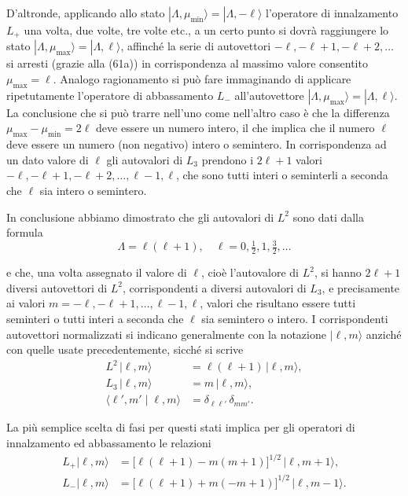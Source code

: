 \documentclass[11pt, a4paper]{book}
\numberwithin{equation}{section}
\begin{document}
D'altronde, applicando allo stato $|\Lambda,\mu_{\min}\rangle =
|\Lambda,-\ell\rangle$ l'operatore di innalzamento $L_+$ una volta, due
volte, tre volte etc., a un certo punto si dovrà raggiungere lo stato
$|\Lambda,\mu_{\max}\rangle = |\Lambda,\ell\rangle$, affinché la serie di
autovettori $-\ell, -\ell+1, -\ell+2, \ldots$ si arresti (grazie alla
(61a)) in corrispondenza al massimo valore consentito $\mu_{\max} = \ell$.
Analogo ragionamento si può fare immaginando di applicare ripetutamente
l'operatore di abbassamento $L_-$ all'autovettore $|\Lambda,\mu_{\max}\rangle
= |\Lambda,\ell\rangle$. La conclusione che si può trarre nell'uno come
nell'altro caso è che la differenza $\mu_{\max}-\mu_{\min} = 2\ell$ deve
essere un numero intero, il che implica che il numero $\ell$ deve essere
un numero (non negativo) intero o semintero. In corrispondenza ad un dato
valore di $\ell$ gli autovalori di $L_3$ prendono i $2\ell+1$ valori
$-\ell, -\ell+1, -\ell+2, \ldots, \ell-1, \ell$, che sono tutti interi o
seminterli a seconda che $\ell$ sia intero o semintero.

In conclusione abbiamo dimostrato che gli autovalori di $L^2$ sono dati
dalla formula
\begin{equation}
\Lambda = \ell(\ell+1), \quad \ell = 0, \tfrac{1}{2}, 1, \tfrac{3}{2},
\ldots
\end{equation}


e che, una volta assegnato il valore di $\ell$, cioè l'autovalore di
$L^2$, si hanno $2\ell+1$ diversi autovettori di $L^2$, corrispondenti a
diversi autovalori di $L_3$, e precisamente ai valori $m = -\ell,
-\ell+1, \ldots, \ell-1, \ell$, valori che risultano essere tutti
seminteri o tutti interi a seconda che $\ell$ sia semintero o intero. I
corrispondenti autovettori normalizzati si indicano generalmente con la
notazione $|\ell,m\rangle$ anziché con quelle usate precedentemente,
sicché si scrive
\begin{align}
L^2\,|\ell,m\rangle &= \ell(\ell+1)\,|\ell,m\rangle, \tag{66} \\
L_3\,|\ell,m\rangle &= m\,|\ell,m\rangle, \tag{67} \\
\langle \ell',m' \mid \ell,m \rangle &= \delta_{\ell\ell'}\,\delta_{mm'}. \tag{68}
\end{align}

La più semplice scelta di fasi per questi stati implica per gli operatori
di innalzamento ed abbassamento le relazioni
\begin{align}
L_+|\ell,m\rangle &= \bigl[\ell(\ell+1)-m(m+1)\bigr]^{1/2}\,|\ell,m+1\rangle, \tag{69a} \\
L_-|\ell,m\rangle &= \bigl[\ell(\ell+1)+m(-m+1)\bigr]^{1/2}\,|\ell,m-1\rangle. \tag{69b}
\end{align}
\end{document}
